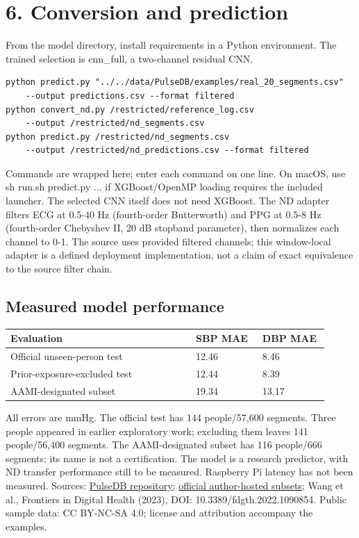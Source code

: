 \documentclass[11pt,letterpaper]{article}
\begin{document}
\section*{6. Conversion and prediction}
From the model directory, install requirements in a Python environment. The trained selection is cnn\_full, a two-channel residual CNN.
\begin{verbatim}
python predict.py "../../data/PulseDB/examples/real_20_segments.csv" 
    --output predictions.csv --format filtered
python convert_nd.py /restricted/reference_log.csv 
    --output /restricted/nd_segments.csv
python predict.py /restricted/nd_segments.csv 
    --output /restricted/nd_predictions.csv --format filtered
\end{verbatim}
Commands are wrapped here; enter each command on one line. On macOS, use sh run.sh predict.py ... if XGBoost/OpenMP loading requires the included launcher. The selected CNN itself does not need XGBoost.
The ND adapter filters ECG at 0.5-40 Hz (fourth-order Butterworth) and PPG at 0.5-8 Hz (fourth-order Chebyshev II, 20 dB stopband parameter), then normalizes each channel to 0-1. The source uses provided filtered channels; this window-local adapter is a defined deployment implementation, not a claim of exact equivalence to the source filter chain.
\subsection*{Measured model performance}

\par\smallskip
\begin{tabular}{@{}p{0.53\linewidth}p{0.19\linewidth}p{0.19\linewidth}@{}}\toprule
Evaluation & SBP MAE & DBP MAE\\\midrule
Official unseen-person test & 12.46 & 8.46\\
Prior-exposure-excluded test & 12.44 & 8.39\\
AAMI-designated subset & 19.34 & 13.17\\
\bottomrule\end{tabular}\par\smallskip
All errors are mmHg. The official test has 144 people/57,600 segments. Three people appeared in earlier exploratory work; excluding them leaves 141 people/56,400 segments. The AAMI-designated subset has 116 people/666 segments; its name is not a certification. The model is a research predictor, with ND transfer performance still to be measured. Raspberry Pi latency has not been measured.
\small Sources: \href{https://github.com/pulselabteam/PulseDB}{PulseDB repository}; \href{https://www.kaggle.com/datasets/weinanwangrutgers/pulsedb-balanced-training-and-testing}{official author-hosted subsets}; Wang et al., Frontiers in Digital Health (2023), DOI: 10.3389/fdgth.2022.1090854. Public sample data: CC BY-NC-SA 4.0; license and attribution accompany the examples.\newpage
\end{document}
